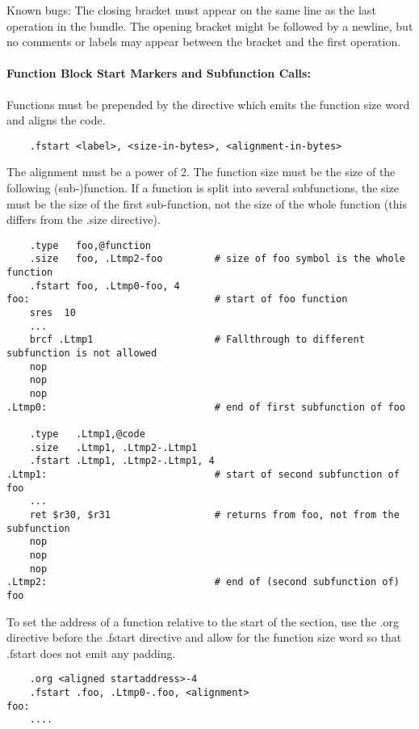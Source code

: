 Known bugs:
The closing bracket must appear on the same line as the last operation in the bundle. The opening bracket might
be followed by a newline, but no comments or labels may appear between the bracket and the first operation.


\paragraph{Function Block Start Markers and Subfunction Calls:}
Functions must be prepended by the  directive which emits the function size word and aligns the
code.

\begin{verbatim}
    .fstart <label>, <size-in-bytes>, <alignment-in-bytes>
\end{verbatim}

The alignment must be a power of 2. The function size must be the size of the following (sub-)function.
If a function is split into several subfunctions, the size must be the size of the first sub-function,
not the size of the whole function (this differs from the .size directive).

\begin{verbatim}
    .type   foo,@function
    .size   foo, .Ltmp2-foo         # size of foo symbol is the whole function
    .fstart foo, .Ltmp0-foo, 4
foo:                                # start of foo function
    sres  10
    ...
    brcf .Ltmp1                     # Fallthrough to different subfunction is not allowed
    nop
    nop
    nop
.Ltmp0:                             # end of first subfunction of foo

    .type   .Ltmp1,@code
    .size   .Ltmp1, .Ltmp2-.Ltmp1
    .fstart .Ltmp1, .Ltmp2-.Ltmp1, 4
.Ltmp1:                             # start of second subfunction of foo
    ...
    ret $r30, $r31                  # returns from foo, not from the subfunction
    nop
    nop
    nop
.Ltmp2:                             # end of (second subfunction of) foo
\end{verbatim}

To set the address of a function relative to the start of the section, use the .org directive before
the .fstart directive and allow for the function size word so that .fstart does not emit any padding.

\begin{verbatim}
    .org <aligned startaddress>-4
    .fstart .foo, .Ltmp0-.foo, <alignment>
foo:
    ....
\end{verbatim}


